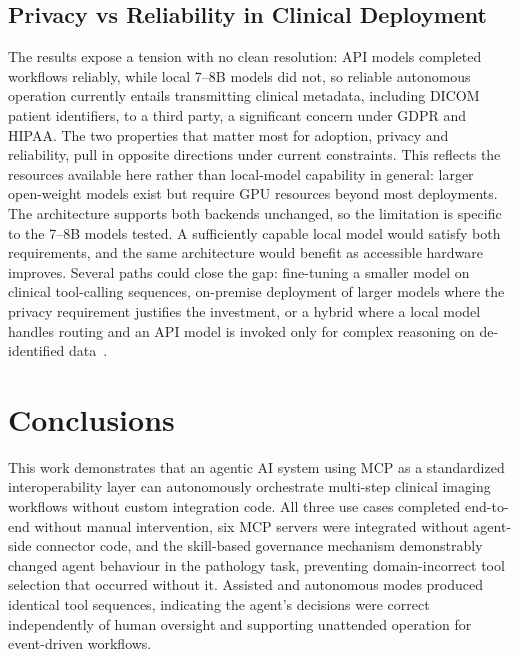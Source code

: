 \documentclass[conference]{IEEEtran}
\begin{document}
\subsection{Privacy vs Reliability in Clinical Deployment}
The results expose a tension with no clean resolution: API models completed workflows reliably, while local 7--8B models did not, so reliable autonomous operation currently entails transmitting clinical metadata, including DICOM patient identifiers, to a third party, a significant concern under GDPR and HIPAA. The two properties that matter most for adoption, privacy and reliability, pull in opposite directions under current constraints. This reflects the resources available here rather than local-model capability in general: larger open-weight models exist but require GPU resources beyond most deployments. The architecture supports both backends unchanged, so the limitation is specific to the 7--8B models tested. A sufficiently capable local model would satisfy both requirements, and the same architecture would benefit as accessible hardware improves. Several paths could close the gap: fine-tuning a smaller model on clinical tool-calling sequences, on-premise deployment of larger models where the privacy requirement justifies the investment, or a hybrid where a local model handles routing and an API model is invoked only for complex reasoning on de-identified data~\cite{trustworthyai2025, dietrich2025agentic, agiformedicalimaging2025}.

\section{Conclusions}
This work demonstrates that an agentic AI system using MCP as a standardized interoperability layer can autonomously orchestrate multi-step clinical imaging workflows without custom integration code. All three use cases completed end-to-end without manual intervention, six MCP servers were integrated without agent-side connector code, and the skill-based governance mechanism demonstrably changed agent behaviour in the pathology task, preventing domain-incorrect tool selection that occurred without it. Assisted and autonomous modes produced identical tool sequences, indicating the agent's decisions were correct independently of human oversight and supporting unattended operation for event-driven workflows.
\end{document}

